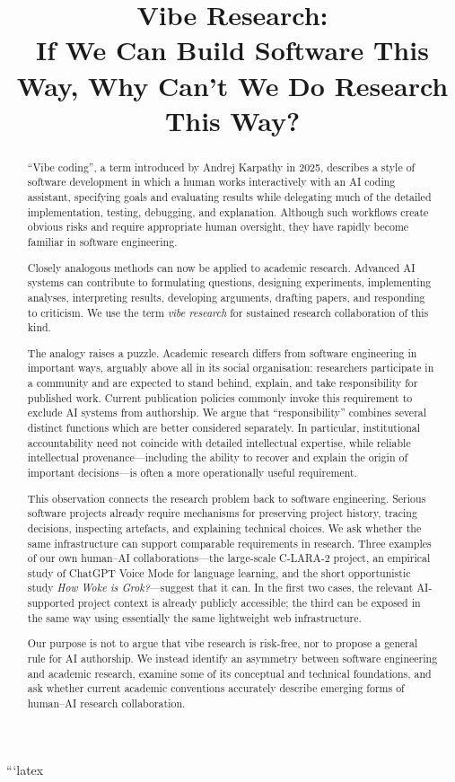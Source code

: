 ```latex
\title{Vibe Research:\\
If We Can Build Software This Way, Why Can't We Do Research This Way?}

\begin{abstract}
``Vibe coding'', a term introduced by Andrej Karpathy in 2025, describes a style of software development in which a human works interactively with an AI coding assistant, specifying goals and evaluating results while delegating much of the detailed implementation, testing, debugging, and explanation. Although such workflows create obvious risks and require appropriate human oversight, they have rapidly become familiar in software engineering.

Closely analogous methods can now be applied to academic research. Advanced AI systems can contribute to formulating questions, designing experiments, implementing analyses, interpreting results, developing arguments, drafting papers, and responding to criticism. We use the term \emph{vibe research} for sustained research collaboration of this kind.

The analogy raises a puzzle. Academic research differs from software engineering in important ways, arguably above all in its social organisation: researchers participate in a community and are expected to stand behind, explain, and take responsibility for published work. Current publication policies commonly invoke this requirement to exclude AI systems from authorship. We argue that ``responsibility'' combines several distinct functions which are better considered separately. In particular, institutional accountability need not coincide with detailed intellectual expertise, while reliable intellectual provenance---including the ability to recover and explain the origin of important decisions---is often a more operationally useful requirement.

This observation connects the research problem back to software engineering. Serious software projects already require mechanisms for preserving project history, tracing decisions, inspecting artefacts, and explaining technical choices. We ask whether the same infrastructure can support comparable requirements in research. Three examples of our own human--AI collaborations---the large-scale C-LARA-2 project, an empirical study of ChatGPT Voice Mode for language learning, and the short opportunistic study \emph{How Woke is Grok?}---suggest that it can. In the first two cases, the relevant AI-supported project context is already publicly accessible; the third can be exposed in the same way using essentially the same lightweight web infrastructure.

Our purpose is not to argue that vibe research is risk-free, nor to propose a general rule for AI authorship. We instead identify an asymmetry between software engineering and academic research, examine some of its conceptual and technical foundations, and ask whether current academic conventions accurately describe emerging forms of human--AI research collaboration.
\end{abstract}


